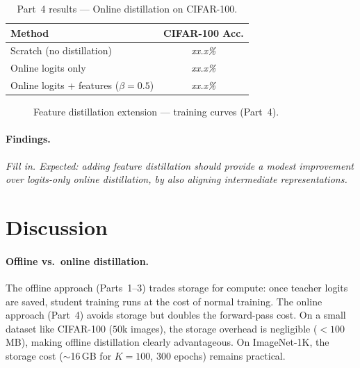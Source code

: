 \documentclass[10pt,twocolumn]{article}
\begin{document}
\begin{table}[h]
\centering
\caption{Part~4 results --- Online distillation on CIFAR-100.}
\label{tab:part4}
\small
\begin{tabular}{@{}lc@{}}
\toprule
Method & CIFAR-100 Acc. \\
\midrule
Scratch (no distillation) & \textit{xx.x\%} \\
Online logits only        & \textit{xx.x\%} \\
Online logits + features ($\beta\!=\!0.5$) & \textit{xx.x\%} \\
\bottomrule
\end{tabular}
\end{table}

\begin{figure}[h]
  \centering
  \caption{Feature distillation extension --- training curves (Part~4).}
  \label{fig:part4}
\end{figure}

\paragraph{Findings.}
\textit{Fill in.
Expected: adding feature distillation should provide a modest improvement
over logits-only online distillation, by also aligning intermediate
representations.}

\section{Discussion}
\label{sec:discussion}

\paragraph{Offline vs.\ online distillation.}
The offline approach (Parts~1--3) trades storage for compute:
once teacher logits are saved, student training runs at the cost of
normal training.
The online approach (Part~4) avoids storage but doubles the forward-pass
cost.
On a small dataset like CIFAR-100 ($50$k images), the storage overhead is
negligible ($<100$\,MB), making offline distillation clearly advantageous.
On ImageNet-1K, the storage cost ($\sim$16\,GB for $K\!=\!100$, $300$
epochs) remains practical.
\end{document}
